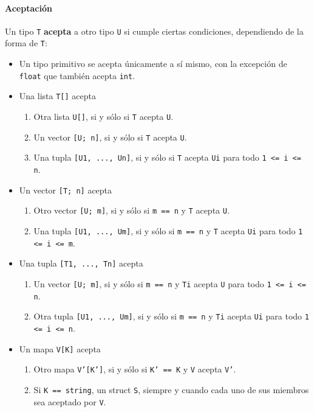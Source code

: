 \paragraph{Aceptación}
Un tipo \texttt{T} \textbf{acepta} a otro tipo \texttt{U} si cumple ciertas condiciones, dependiendo de la forma de \texttt{T}:

\begin{itemize}
	\item Un tipo primitivo se acepta únicamente a sí mismo, con la excepción de \texttt{float} que también acepta \texttt{int}.
	\item Una lista \texttt{T[]} acepta
	\begin{enumerate}
		\item Otra lista \texttt{U[]}, si y sólo si \texttt{T} acepta \texttt{U}.
		\item Un vector \texttt{[U; n]}, si y sólo si \texttt{T} acepta \texttt{U}.
		\item Una tupla \texttt{[U1, ..., Un]}, si y sólo si \texttt{T} acepta \texttt{Ui} para todo \texttt{1 <= i <= n}.
	\end{enumerate}
	\item Un vector \texttt{[T; n]} acepta
	\begin{enumerate}
		\item Otro vector \texttt{[U; m]}, si y sólo si \texttt{m == n} y \texttt{T} acepta \texttt{U}.
		\item Una tupla \texttt{[U1, ..., Um]}, si y sólo si \texttt{m == n} y \texttt{T} acepta \texttt{Ui} para todo \texttt{1 <= i <= m}.
	\end{enumerate}
	\item Una tupla \texttt{[T1, ..., Tn]} acepta
	\begin{enumerate}
		\item Un vector \texttt{[U; m]}, si y sólo si \texttt{m == n} y \texttt{Ti} acepta \texttt{U} para todo \texttt{1 <= i <= n}.
		\item Otra tupla \texttt{[U1, ..., Um]}, si y sólo si \texttt{m == n} y \texttt{Ti} acepta \texttt{Ui} para todo \texttt{1 <= i <= n}.
	\end{enumerate}
	\item Un mapa \texttt{V[K]} acepta
	\begin{enumerate}
		\item Otro mapa \texttt{V'[K']}, si y sólo si \texttt{K' == K} y \texttt{V} acepta \texttt{V'}.
		\item Si \texttt{K == string}, un struct \texttt{S}, siempre y cuando cada uno de sus miembros sea aceptado por \texttt{V}.

\end{enumerate}
\end{itemize}

